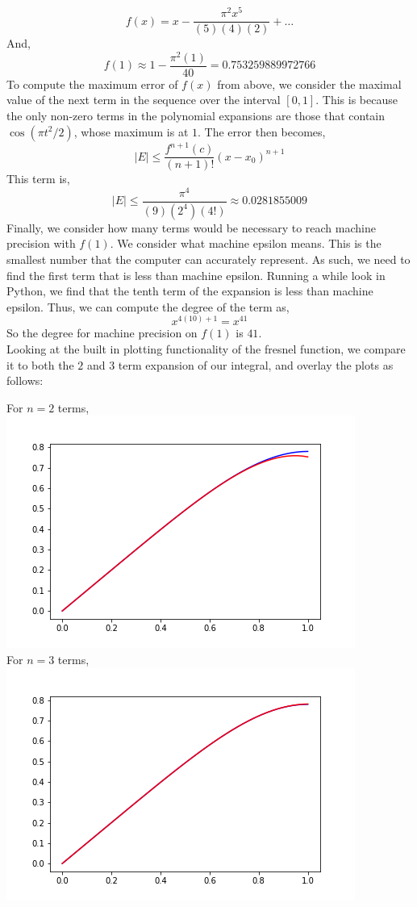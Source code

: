 \documentclass[letterpaper,10pt]{article}
\begin{document}
\begin{enumerate}
\[f(x)= x-\frac{\pi^2x^5}{(5)(4)(2)}+\ldots\]
And,
\[f(1)\approx 1-\frac{\pi^2(1)}{40}=0.753259889972766\]
To compute the maximum error of $f(x)$ from above, we consider the maximal value of the next term in the sequence over the interval $[0,1]$. This is because the only non-zero terms in the polynomial expansions are those that contain $\cos(\pi t^2/2)$, whose maximum is at $1$. The error then becomes,
\[|E|\leq\frac{f^{n+1}(c)}{(n+1)!}(x-x_0)^{n+1}\]
This term is,
\[|E|\leq\frac{\pi^4}{(9)(2^4)(4!)}\approx 0.0281855009\]
Finally, we consider how many terms would be necessary to reach machine precision with $f(1)$. We consider what machine epsilon means. This is the smallest number that the computer can accurately represent. As such, we need to find the first term that is less than machine epsilon. Running a while look in Python, we find that the tenth term of the expansion is less than machine epsilon. Thus, we can compute the degree of the term as,
\[x^{4(10)+1}=x^{41}\]
So the degree for machine precision on $f(1)$ is $41$.\\
Looking at the built in plotting functionality of the fresnel function, we compare it to both the $2$ and $3$ term expansion of our integral, and overlay the plots as follows:
\begin{center}
For $n=2$ terms,\\
\includegraphics[scale=.65]{10a.png}\\
For $n=3$ terms,\\
\includegraphics[scale=.65]{10b.png}

\end{center}
\end{enumerate}
\end{document}
